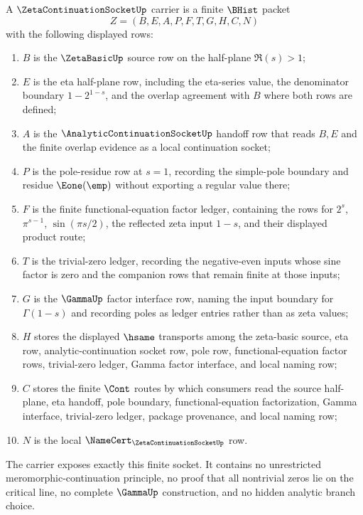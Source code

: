 \begin{definition}
\label{def:zeta-continuation-socket-carrier}
A $\ZetaContinuationSocketUp$ carrier is a finite $\BHist$ packet
$$
Z=(B,E,A,P,F,T,G,H,C,N)
$$
with the following displayed rows:
\begin{enumerate}
\item $B$ is the $\ZetaBasicUp$ source row on the half-plane $\Re(s)>1$;
\item $E$ is the eta half-plane row, including the eta-series value, the denominator boundary $1-2^{1-s}$, and the overlap agreement with $B$ where both rows are defined;
\item $A$ is the $\AnalyticContinuationSocketUp$ handoff row that reads $B,E$ and the finite overlap evidence as a local continuation socket;
\item $P$ is the pole-residue row at $s=1$, recording the simple-pole boundary and residue $\Eone(\emp)$ without exporting a regular value there;
\item $F$ is the finite functional-equation factor ledger, containing the rows for $2^s$, $\pi^{s-1}$, $\sin(\pi s/2)$, the reflected zeta input $1-s$, and their displayed product route;
\item $T$ is the trivial-zero ledger, recording the negative-even inputs whose sine factor is zero and the companion rows that remain finite at those inputs;
\item $G$ is the $\GammaUp$ factor interface row, naming the input boundary for $\Gamma(1-s)$ and recording poles as ledger entries rather than as zeta values;
\item $H$ stores the displayed $\hsame$ transports among the zeta-basic source, eta row, analytic-continuation socket row, pole row, functional-equation factor rows, trivial-zero ledger, Gamma factor interface, and local naming row;
\item $C$ stores the finite $\Cont$ routes by which consumers read the source half-plane, eta handoff, pole boundary, functional-equation factorization, Gamma interface, trivial-zero ledger, package provenance, and local naming row;
\item $N$ is the local $\NameCert_{\ZetaContinuationSocketUp}$ row.
\end{enumerate}
The carrier exposes exactly this finite socket. It contains no unrestricted meromorphic-continuation principle, no proof that all nontrivial zeros lie on the critical line, no complete $\GammaUp$ construction, and no hidden analytic branch choice.
\end{definition}


